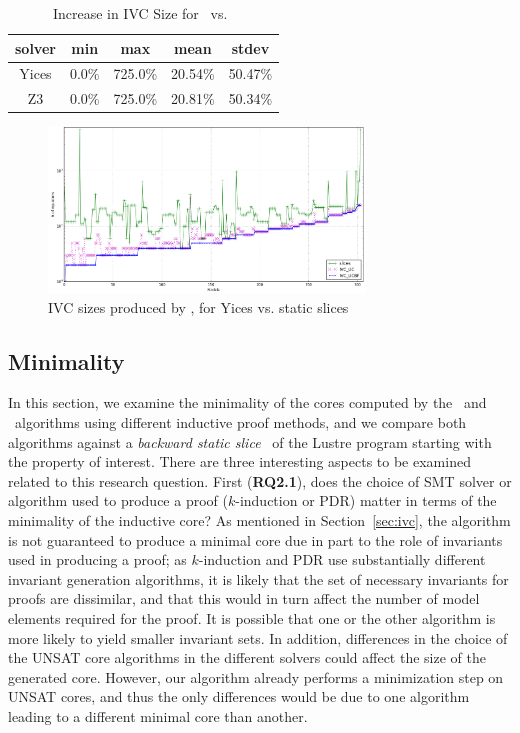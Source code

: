 \begin{table}
  \centering
  \begin{tabular}{ |c||c|c|c|c| }
    \hline
     solver & min & max & mean & stdev \\[0.5ex]
    \hline
    Yices &   0.0\%   & 725.0\% & 20.54\% & 50.47\% \\[0.5ex]
    Z3 &   0.0\%   & 725.0\% & 20.81\% & 50.34\% \\[0.5ex]
    \hline
  \end{tabular}
  \caption{Increase in IVC Size for \ucalg\ vs.\ \ucbfalg}
  \label{tab:increase-ucalg-ucbfalg}
\end{table}


\begin{figure}
  \centering
  \includegraphics[width=0.75\textwidth]{figs/minimality.png}
  \caption{IVC sizes produced by \ucalg, \ucbfalg for Yices vs. static slices}
  \vspace{-0.1in}
  \label{fig:minimality-all}
\end{figure}

\subsection{Minimality}
\label{sec:minimality}
In this section, we examine the minimality of the cores computed by
the \ucalg\ and \ucbfalg\ algorithms using different inductive proof methods, and we compare both algorithms against a {\em backward static slice}~\cite{Tip95asurvey} of the Lustre program starting with the property of interest.
There are three interesting aspects to be examined
related to this research question.  First (\textbf{RQ2.1}), does the
choice of SMT solver or algorithm used to produce a proof
($k$-induction or PDR) matter in terms of the minimality of the
inductive core?  As mentioned in Section~\ref{sec:ivc}, the \ucalg
algorithm is not guaranteed to produce a minimal core due in part to
the role of invariants used in producing a proof; as $k$-induction and
PDR use substantially different invariant generation algorithms, it is
likely that the set of necessary invariants for proofs are dissimilar,
and that this would in turn affect the number of model elements required for
the proof.  It is possible that one or the other algorithm is more likely
to yield smaller invariant sets.  In addition, differences in the choice of the
UNSAT core algorithms in the different solvers could affect the size of the
generated core. However, our algorithm already performs a minimization
step on UNSAT cores, and thus the only differences would be due to one
algorithm leading to a different minimal core than another.

